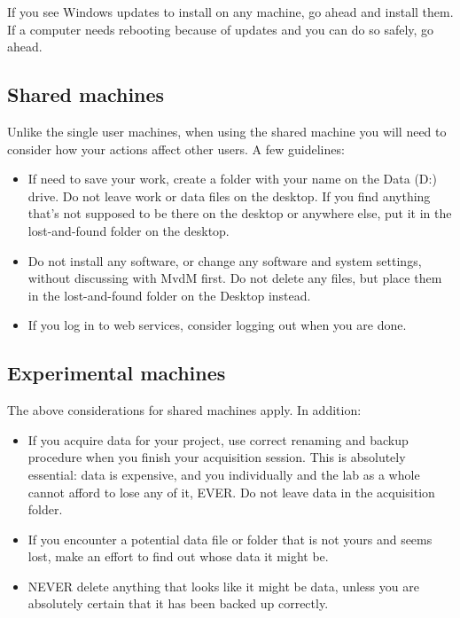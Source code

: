 \documentclass{tufte-book}
\begin{document}
If you see Windows updates to install on any machine, go ahead and
install them. If a computer needs rebooting because of updates and you
can do so safely, go ahead.

\subsection{Shared machines}

Unlike the single user machines, when using the shared machine you
will need to consider how your actions affect other users. A few
guidelines:

\begin{itemize}
\item{If need to save your work, create a folder with your name on the
  Data (D:) drive. Do not leave work or data files on the desktop. If
  you find anything that's not supposed to be there on the desktop or
  anywhere else, put it in the lost-and-found folder on the desktop.}
\item{Do not install any software, or change any software and system
  settings, without discussing with MvdM first. Do not delete any
  files, but place them in the lost-and-found folder on the Desktop
  instead.}
\item{If you log in to web services, consider logging out when you
  are done.}
\end{itemize}

\subsection{Experimental machines}

The above considerations for shared machines apply. In addition:

\begin{itemize}
\item{If you acquire data for your project, use correct renaming and
  backup procedure when you finish your acquisition session. This is
  absolutely essential: data is expensive, and you individually and
  the lab as a whole cannot afford to lose any of it, EVER. Do not
  leave data in the acquisition folder.}
\item{If you encounter a potential data file or folder that is not
  yours and seems lost, make an effort to find out whose data it might
  be.}
\item{NEVER delete anything that looks like it might be data, unless
  you are absolutely certain that it has been backed up correctly.}
\end{itemize}
\end{document}
